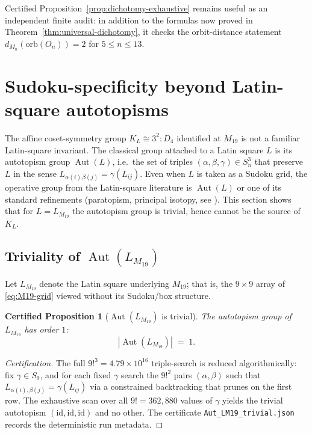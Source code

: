 \documentclass[11pt,a4paper]{article}
\newtheorem{certprop}[theorem]{Certified Proposition}
\theoremstyle{definition}
\theoremstyle{remark}
\providecommand{\Aut}{\operatorname{Aut}}
\newcommand{\KL}{K_L}
\begin{document}
Certified Proposition~\ref{prop:dichotomy-exhaustive} remains useful as an
independent finite audit: in addition to the formulas now proved in
Theorem~\ref{thm:universal-dichotomy}, it checks the orbit-distance
statement $d_{M_n}(\mathrm{orb}(O_n)) = 2$ for $5 \le n \le 13$.

\section{Sudoku-specificity beyond Latin-square autotopisms}
\label{sec:autLM19}

The affine coset-symmetry group $\KL \cong 3^2{:}D_4$ identified at $M_{19}$ is
not a familiar Latin-square invariant. The classical group attached
to a Latin square $L$ is its autotopism group $\Aut(L)$,
i.e.\ the set of triples $(\alpha, \beta, \gamma) \in S_n^3$ that
preserve $L$ in the sense $L_{\alpha(i)\,\beta(j)} =
\gamma(L_{ij})$. Even when $L$ is taken as a Sudoku grid, the
operative group from the Latin-square literature is $\Aut(L)$ or one
of its standard refinements (paratopism, principal isotopy, see
\cite{Wanless11, SVW12, AutotopismsPartialLatin20}). This section
shows that for $L = L_{M_{19}}$ the autotopism group is trivial,
hence cannot be the source of $\KL$.

\subsection{\texorpdfstring{Triviality of $\Aut(L_{M_{19}})$}{Triviality of Aut(LM19)}}\label{sec:aut-triv}

Let $L_{M_{19}}$ denote the Latin square underlying $M_{19}$; that
is, the $9 \times 9$ array of \eqref{eq:M19-grid} viewed without
its Sudoku/box structure.

\begin{certprop}[$\Aut(L_{M_{19}})$ is trivial]\label{thm:aut-LM19-trivial}
The autotopism group of $L_{M_{19}}$ has order $1$:
\begin{equation*}
   |\Aut(L_{M_{19}})| \;=\; 1.
\end{equation*}
\end{certprop}

\begin{proof}[Certification]
The full $9!^3 = 4.79 \times 10^{16}$ triple-search is reduced
algorithmically: fix $\gamma \in S_9$, and for each fixed
$\gamma$ search the $9!^2$ pairs $(\alpha, \beta)$ such that
$L_{\alpha(i),\beta(j)} = \gamma(L_{ij})$ via a constrained
backtracking that prunes on the first row. The exhaustive scan over
all $9! = 362{,}880$ values of $\gamma$ yields the trivial autotopism
$(\mathrm{id}, \mathrm{id}, \mathrm{id})$ and no other. The certificate
\texttt{Aut\_LM19\_trivial.json} records the deterministic run metadata.
\end{proof}
\end{document}
